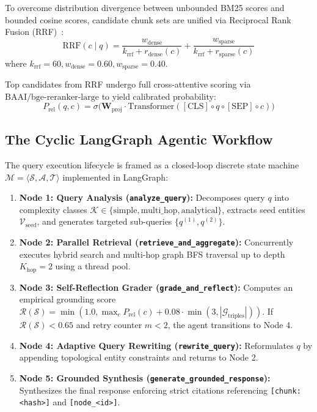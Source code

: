 To overcome distribution divergence between unbounded BM25 scores and bounded cosine scores, candidate chunk sets are unified via Reciprocal Rank Fusion (RRF)~\cite{cormack2009rrf}:
\begin{equation}
\text{RRF}(c \mid q) = \frac{w_{\text{dense}}}{k_{\text{rrf}} + r_{\text{dense}}(c)} + \frac{w_{\text{sparse}}}{k_{\text{rrf}} + r_{\text{sparse}}(c)}
\end{equation}
where $k_{\text{rrf}} = 60, w_{\text{dense}} = 0.60, w_{\text{sparse}} = 0.40$.

Top candidates from RRF undergo full cross-attentive scoring via $\text{BAAI/bge-reranker-large}$ to yield calibrated probability:
\begin{equation}
P_{\text{rel}}(q, c) = \sigma\Big(\mathbf{W}_{\text{proj}} \cdot \text{Transformer}([\text{CLS}] \circ q \circ [\text{SEP}] \circ c)\Big)
\end{equation}

\subsection{The Cyclic LangGraph Agentic Workflow}
The query execution lifecycle is framed as a closed-loop discrete state machine $\mathcal{M} = \langle \mathcal{S}, \mathcal{A}, \mathcal{T} \rangle$ implemented in LangGraph:
\begin{enumerate}
    \item \textbf{Node 1: Query Analysis (\texttt{analyze\_query}):} Decomposes query $q$ into complexity classes $\mathcal{K} \in \{\text{simple}, \text{multi\_hop}, \text{analytical}\}$, extracts seed entities $\mathcal{V}_{\text{seed}}$, and generates targeted sub-queries $\{q^{(1)}, q^{(2)}\}$.
    \item \textbf{Node 2: Parallel Retrieval (\texttt{retrieve\_and\_aggregate}):} Concurrently executes hybrid search and multi-hop graph BFS traversal up to depth $K_{\text{hop}} = 2$ using a thread pool.
    \item \textbf{Node 3: Self-Reflection Grader (\texttt{grade\_and\_reflect}):} Computes an empirical grounding score $\mathcal{R}(\mathcal{S}) = \min(1.0, \max_c P_{\text{rel}}(c) + 0.08 \cdot \min(3, |\mathcal{G}_{\text{triples}}|))$. If $\mathcal{R}(\mathcal{S}) < 0.65$ and retry counter $m < 2$, the agent transitions to Node 4.
    \item \textbf{Node 4: Adaptive Query Rewriting (\texttt{rewrite\_query}):} Reformulates $q$ by appending topological entity constraints and returns to Node 2.
    \item \textbf{Node 5: Grounded Synthesis (\texttt{generate\_grounded\_response}):} Synthesizes the final response enforcing strict citations referencing \texttt{[chunk:<hash>]} and \texttt{[node\_<id>]}.
\end{enumerate}
